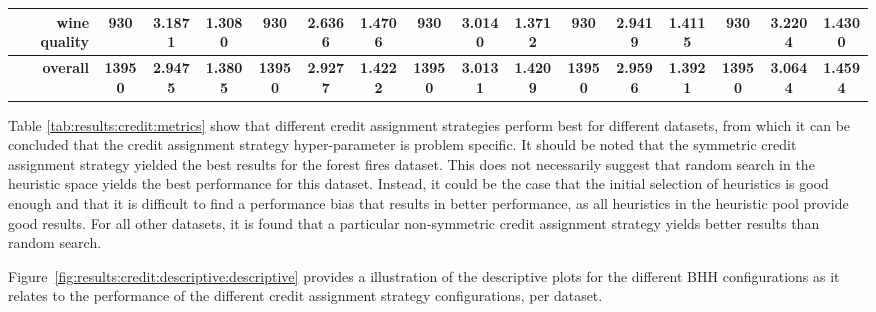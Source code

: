 \begin{table}[H]
{\begin{tabular}{rccccccccccccccc}
			wine quality                        & 930                                 & 3.1871                                                                    & 1.3080          & 930                                & \cellcolor[rgb]{ .776,  .937,  .808}\textcolor[rgb]{ 0,  .38,  0}{2.6366}          & 1.4706          & 930                                & 3.0140                                                                    & 1.3712          & 930                                & 2.9419                                                                    & 1.4115          & 930                                    & 3.2204                                                                    & 1.4300          \\
			\midrule
			\textbf{overall}                    & \textbf{13950}                      & \textbf{2.9475}                                                           & \textbf{1.3805} & \textbf{13950}                     & \cellcolor[rgb]{ .776,  .937,  .808}\textcolor[rgb]{ 0,  .38,  0}{\textbf{2.9277}} & \textbf{1.4222} & \textbf{13950}                     & \textbf{3.0131}                                                           & \textbf{1.4209} & \textbf{13950}                     & \textbf{2.9596}                                                           & \textbf{1.3921} & \textbf{13950}                         & \textbf{3.0644}                                                           & \textbf{1.4594} \\
		\end{tabular}%
	}
\end{table}%

Table \ref{tab:results:credit:metrics} show that different credit assignment strategies perform best for different datasets, from which it can be concluded that the credit assignment strategy hyper-parameter is problem specific. It should be noted that the symmetric credit assignment strategy yielded the best results for the forest fires dataset. This does not necessarily suggest that random search in the heuristic space yields the best performance for this dataset. Instead, it could be the case that the initial selection of heuristics is good enough and that it is difficult to find a performance bias that results in better performance, as all heuristics in the heuristic pool provide good results. For all other datasets, it is found that a particular non-symmetric credit assignment strategy yields better results than random search.

Figure~\ref{fig:results:credit:descriptive:descriptive} provides a illustration of the descriptive plots for the different \acs{BHH} configurations as it relates to the performance of the different credit assignment strategy configurations, per dataset.

